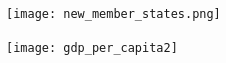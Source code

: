 \documentclass{beamer}
\begin{document}
\begin{frame}
  \begin{figure}
    \texttt{[image: new\_member\_states.png]}
  \end{figure}
\end{frame}

\begin{frame}
  \begin{figure}
    \texttt{[image: gdp\_per\_capita2]}
  \end{figure}
\end{frame}


\end{document}
